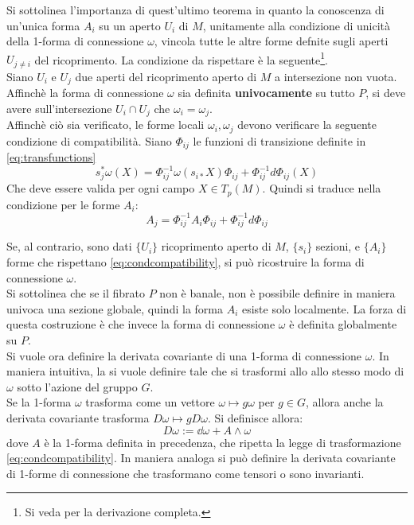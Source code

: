 Si sottolinea l'importanza di quest'ultimo teorema in quanto la conoscenza di un'unica
forma $A_i$ su un aperto $U_i$ di $M$, unitamente alla condizione di unicità della
1-forma di connessione $\omega$, vincola tutte le altre forme defnite sugli aperti
$U_{j\neq i}$ del ricoprimento. La condizione da rispettare è la seguente\footnote{
Si veda \cite{nakahara} per la derivazione completa.
}.\\

Siano $U_i$ e $U_j$ due aperti del ricoprimento aperto di $M$ a intersezione non vuota.
Affinchè la forma di connessione $\omega$ sia definita \textbf{univocamente} su tutto $P$,
si deve avere sull'intersezione $U_i \cap U_j$ che $\omega_i = \omega_j$.\\
Affinchè ciò sia verificato, le forme locali $\omega_i,\omega_j$ devono verificare
la seguente condizione di compatibilità. Siano $\Phi_{ij}$ le funzioni di transizione
definite in \ref{eq:transfunctions}
$$
   s^*_j \omega (X) = \Phi_{ij}^{-1} \omega( s_{i*} X ) \Phi_{ij}
                         + \Phi_{ij}^{-1}d\Phi_{ij}(X)
$$
Che deve essere valida per ogni campo $X \in T_p(M)$. Quindi si traduce nella
condizione per le forme $A_i$:
\begin{equation}\label{eq:condcompatibility}
   A_j = \Phi_{ij}^{-1} A_i \Phi_{ij} + \Phi_{ij}^{-1}d\Phi_{ij}
\end{equation}

Se, al contrario, sono dati $\{U_i\}$ ricoprimento aperto di $M$, $\{s_i\}$
sezioni, e $\{A_i\}$ forme che rispettano \ref{eq:condcompatibility}, si può
ricostruire la forma di connessione $\omega$.\\

Si sottolinea che se il fibrato $P$ non è banale, non è possibile definire in
maniera univoca una sezione globale, quindi la forma $A_i$ esiste solo localmente.
La forza di questa costruzione è che invece la forma di connessione $\omega$
è definita globalmente su $P$.\\

Si vuole ora definire la derivata covariante di una
1-forma di connessione $\omega$.
In maniera intuitiva, la si vuole definire tale che si trasformi allo
allo stesso modo di $\omega$ sotto l'azione del gruppo $G$.\\
Se la 1-forma $\omega$ trasforma come un vettore $\omega \mapsto g\omega$ per
$g \in G$, allora anche la derivata covariante trasforma $ D\omega \mapsto
g D\omega $. Si definisce allora:
   $$ D\omega := \dd\omega + A \wedge \omega $$
dove $A$ è la 1-forma definita in precedenza, che ripetta la legge di
trasformazione \ref{eq:condcompatibility}. In maniera analoga si può definire la
derivata covariante di 1-forme di connessione che trasformano come tensori o sono
invarianti.

